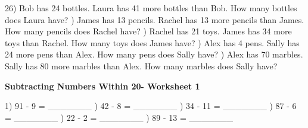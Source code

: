 \documentclass{article}%
\begin{document}
26) Bob has 24 bottles. Laura has 41 more bottles than Bob. How many bottles does Laura have?%
\newline%
\newline%
) James has 13 pencils. Rachel has 13 more pencils than James. How many pencils does Rachel have?%
\newline%
\newline%
) Rachel has 21 toys. James has 34 more toys than Rachel. How many toys does James have?%
\newline%
\newline%
) Alex has 4 pens. Sally has 24 more pens than Alex. How many pens does Sally have?%
\newline%
\newline%
) Alex has 70 marbles. Sally has 80 more marbles than Alex. How many marbles does Sally have?%
\newline%
\newline%
\newline%
\pagebreak%
\large%
\begin{center}%
\textbf{Subtracting Numbers Within 20- Worksheet 1}%
\newline%
\newline%
\newline%
\end{center} \normalsize%
1) 91 {-} 9 = \_\_\_\_\_\_\_%
\newline%
\newline%
) 42 {-} 8 = \_\_\_\_\_\_\_%
\newline%
\newline%
) 34 {-} 11 = \_\_\_\_\_\_\_%
\newline%
\newline%
) 87 {-} 6 = \_\_\_\_\_\_\_%
\newline%
\newline%
) 22 {-} 2 = \_\_\_\_\_\_\_%
\newline%
\newline%
) 89 {-} 13 = \_\_\_\_\_\_\_%
\newline%
\newline%
\newline%
\end{document}
